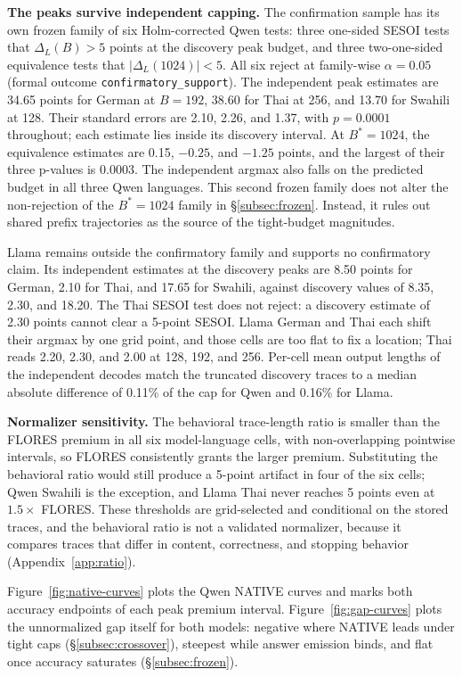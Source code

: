 \documentclass[11pt]{article}
\begin{document}
\textbf{The peaks survive independent capping.} The confirmation sample has its own frozen family of six Holm-corrected Qwen tests: three one-sided SESOI tests that \(\Delta_L(B)>5\) points at the discovery peak budget, and three two-one-sided equivalence tests that \(|\Delta_L(1024)|<5\). All six reject at family-wise \(\alpha=0.05\) (formal outcome \texttt{confirmatory\_support}). The independent peak estimates are 34.65 points for German at \(B=192\), 38.60 for Thai at 256, and 13.70 for Swahili at 128. Their standard errors are 2.10, 2.26, and 1.37, with \(p=0.0001\) throughout; each estimate lies inside its discovery interval. At \(B^*=1024\), the equivalence estimates are 0.15, \(-0.25\), and \(-1.25\) points, and the largest of their three p-values is 0.0003. The independent argmax also falls on the predicted budget in all three Qwen languages. This second frozen family does not alter the non-rejection of the \(B^*=1024\) family in \S\ref{subsec:frozen}. Instead, it rules out shared prefix trajectories as the source of the tight-budget magnitudes.

Llama remains outside the confirmatory family and supports no confirmatory claim. Its independent estimates at the discovery peaks are 8.50 points for German, 2.10 for Thai, and 17.65 for Swahili, against discovery values of 8.35, 2.30, and 18.20. The Thai SESOI test does not reject: a discovery estimate of 2.30 points cannot clear a 5-point SESOI. Llama German and Thai each shift their argmax by one grid point, and those cells are too flat to fix a location; Thai reads 2.20, 2.30, and 2.00 at 128, 192, and 256. Per-cell mean output lengths of the independent decodes match the truncated discovery traces to a median absolute difference of 0.11\% of the cap for Qwen and 0.16\% for Llama.

\textbf{Normalizer sensitivity.} The behavioral trace-length ratio is smaller than the FLORES premium in all six model-language cells, with non-overlapping pointwise intervals, so FLORES consistently grants the larger premium. Substituting the behavioral ratio would still produce a 5-point artifact in four of the six cells; Qwen Swahili is the exception, and Llama Thai never reaches 5 points even at \(1.5\times\) FLORES. These thresholds are grid-selected and conditional on the stored traces, and the behavioral ratio is not a validated normalizer, because it compares traces that differ in content, correctness, and stopping behavior (Appendix~\ref{app:ratio}).

Figure~\ref{fig:native-curves} plots the Qwen NATIVE curves and marks both accuracy endpoints of each peak premium interval. Figure~\ref{fig:gap-curves} plots the unnormalized gap itself for both models: negative where NATIVE leads under tight caps (\S\ref{subsec:crossover}), steepest while answer emission binds, and flat once accuracy saturates (\S\ref{subsec:frozen}).
\end{document}
